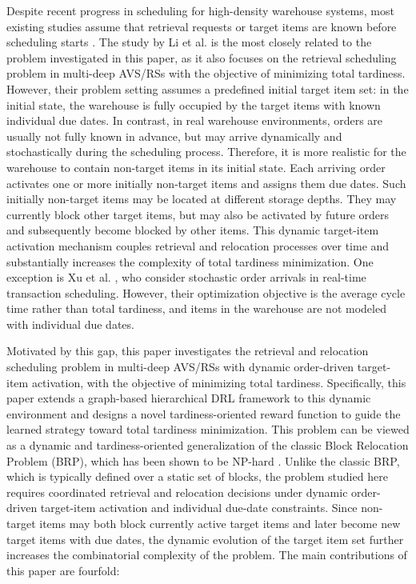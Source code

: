 Despite recent progress in scheduling for high-density warehouse systems, most existing studies assume that retrieval requests or target items are known before scheduling starts \cite{Dong2021,Yang2023,He2023,Ren2025,Liu2026}. The study by Li et al. \cite{Li2025} is the most closely related to the problem investigated in this paper, as it also focuses on the retrieval scheduling problem in multi-deep AVS/RSs with the objective of minimizing total tardiness. However, their problem setting assumes a predefined initial target item set: in the initial state, the warehouse is fully occupied by the target items with known individual due dates. In contrast, in real warehouse environments, orders are usually not fully known in advance, but may arrive dynamically and stochastically during the scheduling process. Therefore, it is more realistic for the warehouse to contain non-target items in its initial state. Each arriving order activates one or more initially non-target items and assigns them due dates. Such initially non-target items may be located at different storage depths. They may currently block other target items, but may also be activated by future orders and subsequently become blocked by other items. This dynamic target-item activation mechanism couples retrieval and relocation processes over time and substantially increases the complexity of total tardiness minimization. One exception is Xu et al. \cite{Xu2026}, who consider stochastic order arrivals in real-time transaction scheduling. However, their optimization objective is the average cycle time rather than total tardiness, and items in the warehouse are not modeled with individual due dates.

Motivated by this gap, this paper investigates the retrieval and relocation scheduling problem in multi-deep AVS/RSs with dynamic order-driven target-item activation, with the objective of minimizing total tardiness. Specifically, this paper extends a graph-based hierarchical DRL framework to this dynamic environment and designs a novel tardiness-oriented reward function to guide the learned strategy toward total tardiness minimization. This problem can be viewed as a dynamic and tardiness-oriented generalization of the classic Block Relocation Problem (BRP), which has been shown to be NP-hard \cite{Caserta2012}. Unlike the classic BRP, which is typically defined over a static set of blocks, the problem studied here requires coordinated retrieval and relocation decisions under dynamic order-driven target-item activation and individual due-date constraints. Since non-target items may both block currently active target items and later become new target items with due dates, the dynamic evolution of the target item set further increases the combinatorial complexity of the problem. The main contributions of this paper are fourfold:

